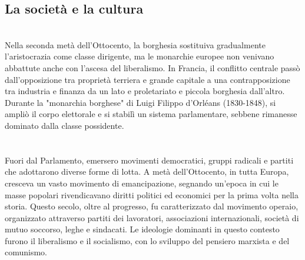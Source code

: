 \documentclass{report}
\begin{document}
\subsection{La società e la cultura}
\\
Nella seconda metà dell'Ottocento, la borghesia sostituiva gradualmente l'aristocrazia come classe dirigente, ma le monarchie europee non venivano abbattute anche con l'ascesa del liberalismo. In Francia, il conflitto centrale passò dall'opposizione tra proprietà terriera e grande capitale a una contrapposizione tra industria e finanza da un lato e proletariato e piccola borghesia dall'altro. Durante la "monarchia borghese" di Luigi Filippo d'Orléans (1830-1848), si ampliò il corpo elettorale e si stabilì un sistema parlamentare, sebbene rimanesse dominato dalla classe possidente.
\\
\\
\\
Fuori dal Parlamento, emersero movimenti democratici, gruppi radicali e partiti che adottarono diverse forme di lotta. A metà dell'Ottocento, in tutta Europa, cresceva un vasto movimento di emancipazione, segnando un'epoca in cui le masse popolari rivendicavano diritti politici ed economici per la prima volta nella storia. Questo secolo, oltre al progresso, fu caratterizzato dal movimento operaio, organizzato attraverso partiti dei lavoratori, associazioni internazionali, società di mutuo soccorso, leghe e sindacati. Le ideologie dominanti in questo contesto furono il liberalismo e il socialismo, con lo sviluppo del pensiero marxista e del comunismo.
\\
\end{document}
